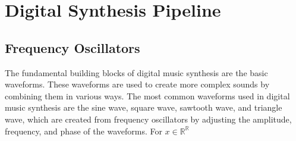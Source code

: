 \documentclass[12pt]{article}
\begin{document}
\section{Digital Synthesis Pipeline}
\subsection{Frequency Oscillators}
The fundamental building blocks of digital music synthesis are the basic waveforms. These waveforms are used to create more complex sounds by combining them in various ways. The most common waveforms used in digital music synthesis are the sine wave, square wave, sawtooth wave, and triangle wave, 
which are created from frequency oscillators by adjusting the amplitude, frequency, and phase of the waveforms.
For $x \in \mathbb{R}^{\mathbb{R}}$ 
\end{document}

